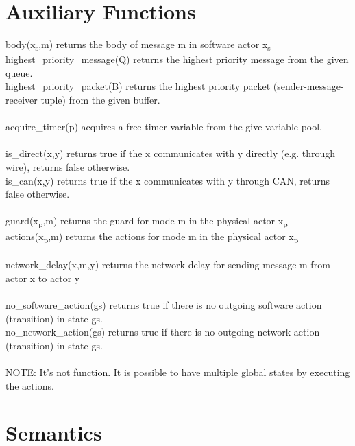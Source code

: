 \documentclass[]{article}
\title{}
\author{}
\begin{document}
\section{Auxiliary Functions}
body(x\textsubscript{s},m) returns the body of message m in software actor x\textsubscript{s} \\
highest\_priority\_message(Q) returns the highest priority message from the given queue. \\
highest\_priority\_packet(B) returns the highest priority packet (sender-message-receiver tuple) from the given buffer. \\ 
\\
acquire\_timer(p) acquires a free timer variable from the give variable pool. \\
\\
is\_direct(x,y) returns true if the x communicates with y directly (e.g. through wire), returns false otherwise. \\
is\_can(x,y) returns true if the x communicates with y through CAN, returns false otherwise. \\
\\
guard(x\textsubscript{p},m) returns the guard for mode m in the physical actor x\textsubscript{p} \\
actions(x\textsubscript{p},m) returns the actions for mode m in the physical actor x\textsubscript{p} \\
\\
network\_delay(x,m,y) returns the network delay for sending message m from actor x to actor y \\
\\
no\_software\_action(gs) returns true if there is no outgoing software action (transition) in state gs. \\
no\_network\_action(gs) returns true if there is no outgoing network action (transition) in state gs. \\
\\

NOTE: It's not function. It is possible to have multiple global states by executing the actions. \\

\section{Semantics}
\end{document}
